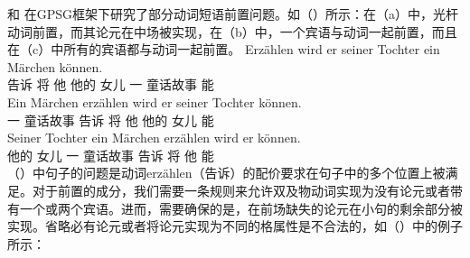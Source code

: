  \citet{Nerbonne86a}和 \citet{Johnson86a}在GPSG框架下研究了部分动词短语前置问题。如（）所示：在（a）中，光杆动词前置，而其论元在中场被实现，在（b）中，一个宾语与动词一起前置，而且在（c）中所有的宾语都与动词一起前置。
\eal
\ex 
\gll Erzählen wird er seiner Tochter ein Märchen können.\\
     告诉  将 他 他的 女儿 一 童话故事 能\\
\ex 
\gll Ein Märchen erzählen wird er seiner Tochter können.\\
     一 童话故事 告诉 将 他 他的 女儿 能\\
\ex 
\gll Seiner Tochter ein Märchen erzählen wird er können.\\
     他的 女儿 一 童话故事 告诉 将 他 能\\
\zl
（）中句子的问题是动词erzählen（告诉）的配价要求在句子中的多个位置上被满足。对于前置的成分，我们需要一条规则来允许双及物动词实现为没有论元或者带有一个或两个宾语。进而，需要确保的是，在前场缺失的论元在小句的剩余部分被实现。省略必有论元或者将论元实现为不同的格属性是不合法的，如（）中的例子所示：
\eal
{}

